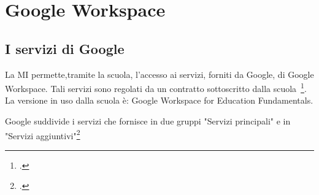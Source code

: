 \chapter{Google Workspace}
\printpartialtoc
\section{I servizi di Google}
La MI permette,tramite la scuola, l'accesso ai servizi, forniti da \textenglish{Google}, di \textenglish{Google Workspace}. Tali servizi sono regolati da un contratto sottoscritto dalla scuola~\footcite{Google2020}. La versione in uso dalla scuola è:  \textenglish{Google Workspace for Education Fundamentals}.

\textenglish{Google} suddivide i servizi che fornisce in due gruppi "Servizi principali" e in "Servizi aggiuntivi"\footcite{Google2021a}

